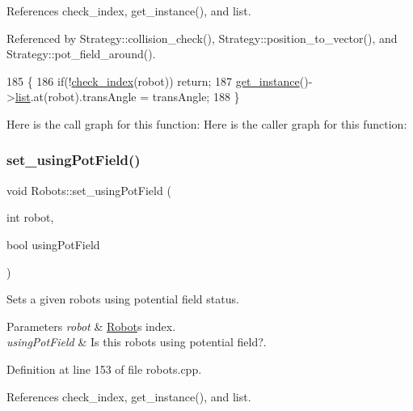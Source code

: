 References check\+\_\+index, get\+\_\+instance(), and list.



Referenced by Strategy\+::collision\+\_\+check(), Strategy\+::position\+\_\+to\+\_\+vector(), and Strategy\+::pot\+\_\+field\+\_\+around().


\begin{DoxyCode}
185                                                         \{
186     \textcolor{keywordflow}{if}(!\hyperlink{robots_8hpp_ae3e6ae8f87cdc750c0b99bc609d9ae43}{check\_index}(robot)) \textcolor{keywordflow}{return};
187     \hyperlink{class_robots_a589bce74db5f34af384952d48435168f}{get\_instance}()->\hyperlink{class_robots_a2c6b77265028f82a4342ca1ef15ed305}{list}.at(robot).transAngle = transAngle;
188 \}
\end{DoxyCode}
Here is the call graph for this function\+:
Here is the caller graph for this function\+:
\mbox{\label{class_robots_a51288c53411bda98c5f9cd05f6ef2a82}} 
\subsubsection{\texorpdfstring{set\+\_\+using\+Pot\+Field()}{set\_usingPotField()}}
{\footnotesize\ttfamily void Robots\+::set\+\_\+using\+Pot\+Field (\begin{DoxyParamCaption}\item[{int}]{robot,  }\item[{bool}]{using\+Pot\+Field }\end{DoxyParamCaption})\hspace{0.3cm}{\ttfamily [static]}}

Sets a given robot\textquotesingle{}s \textquotesingle{}using potential field\textquotesingle{} status. 
\begin{DoxyParams}{Parameters}
{\em robot} & \hyperlink{struct_robots_1_1_robot}{Robot}\textquotesingle{}s index. \\
\hline
{\em using\+Pot\+Field} & Is this robot\textquotesingle{}s using potential field?. \\
\hline
\end{DoxyParams}


Definition at line 153 of file robots.\+cpp.



References check\+\_\+index, get\+\_\+instance(), and list.



